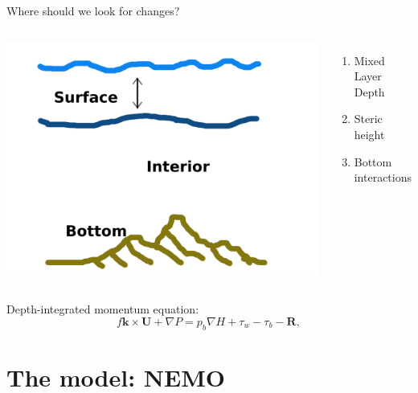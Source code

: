 \documentclass{beamer}
\begin{document}
\begin{frame}{Where should we look for changes?}
\begin{center}
\begin{columns}[c]
\column{1.7in}
\includegraphics[width=1.5\textwidth]{momSink.png}
\column{1.7in}
\pause
\begin{enumerate}
 \item Mixed Layer Depth
 \item Steric height
 \item Bottom interactions
\end{enumerate}

\end{columns}
\end{center}
\begin{alertblock}{Depth-integrated momentum equation:}
 $$f \mathrm{\textbf{k}} \times \mathrm{\textbf{U}} + \nabla P  = p_{b}\nabla H + \tau_{w} - \tau_{b} - \mathrm{\textbf{R}},$$
\end{alertblock}
\end{frame}




\section{The model: NEMO}
\end{document}
